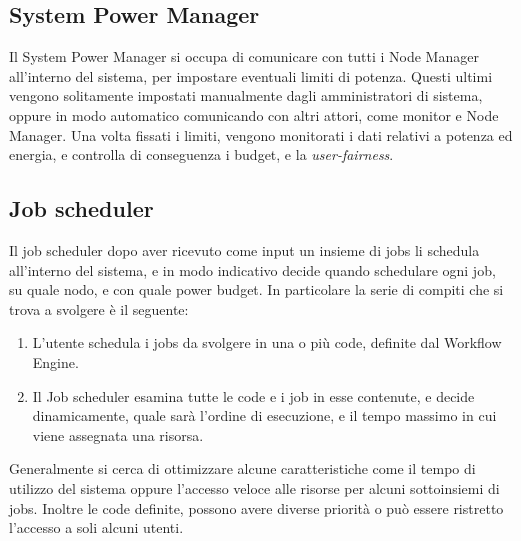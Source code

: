 \subsection{System Power Manager}
Il System Power Manager si occupa di comunicare con tutti i Node Manager all'interno del sistema, per impostare eventuali limiti di potenza. Questi ultimi vengono solitamente impostati manualmente dagli amministratori di sistema, oppure in modo automatico comunicando con altri attori, come monitor e Node Manager. Una volta fissati i limiti, vengono monitorati i dati relativi a potenza ed energia, e controlla di conseguenza i budget, e la \emph{user-fairness}.
\subsection{Job scheduler}
Il job scheduler dopo aver ricevuto come input un insieme di jobs li schedula all'interno del sistema, e in modo indicativo decide quando schedulare ogni job, su quale nodo, e con quale power budget. In particolare la serie di compiti che si trova a svolgere è il seguente:
\begin{enumerate}
    \item L'utente schedula i jobs da svolgere in una o più code, definite dal Workflow Engine.
    \item Il Job scheduler esamina tutte le code e i job in esse contenute, e decide dinamicamente, quale sarà l'ordine di esecuzione, e il tempo massimo in cui viene assegnata una risorsa.
\end{enumerate}
Generalmente si cerca di ottimizzare alcune caratteristiche come il tempo di utilizzo del sistema oppure l'accesso veloce alle risorse per alcuni sottoinsiemi di jobs. Inoltre le code definite, possono avere diverse priorità o può essere ristretto l'accesso a soli alcuni utenti.%

